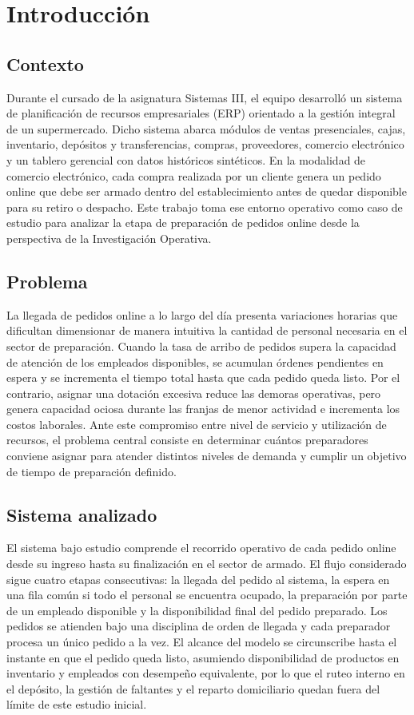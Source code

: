 \section{Introducción}

\subsection{Contexto}
Durante el cursado de la asignatura Sistemas III, el equipo desarrolló un sistema de planificación de recursos empresariales (ERP) orientado a la gestión integral de un supermercado.
Dicho sistema abarca módulos de ventas presenciales, cajas, inventario, depósitos y transferencias, compras, proveedores, comercio electrónico y un tablero gerencial con datos históricos sintéticos.
En la modalidad de comercio electrónico, cada compra realizada por un cliente genera un pedido online que debe ser armado dentro del establecimiento antes de quedar disponible para su retiro o despacho.
Este trabajo toma ese entorno operativo como caso de estudio para analizar la etapa de preparación de pedidos online desde la perspectiva de la Investigación Operativa.

\subsection{Problema}
La llegada de pedidos online a lo largo del día presenta variaciones horarias que dificultan dimensionar de manera intuitiva la cantidad de personal necesaria en el sector de preparación.
Cuando la tasa de arribo de pedidos supera la capacidad de atención de los empleados disponibles, se acumulan órdenes pendientes en espera y se incrementa el tiempo total hasta que cada pedido queda listo.
Por el contrario, asignar una dotación excesiva reduce las demoras operativas, pero genera capacidad ociosa durante las franjas de menor actividad e incrementa los costos laborales.
Ante este compromiso entre nivel de servicio y utilización de recursos, el problema central consiste en determinar cuántos preparadores conviene asignar para atender distintos niveles de demanda y cumplir un objetivo de tiempo de preparación definido.

\subsection{Sistema analizado}
El sistema bajo estudio comprende el recorrido operativo de cada pedido online desde su ingreso hasta su finalización en el sector de armado.
El flujo considerado sigue cuatro etapas consecutivas: la llegada del pedido al sistema, la espera en una fila común si todo el personal se encuentra ocupado, la preparación por parte de un empleado disponible y la disponibilidad final del pedido preparado.
Los pedidos se atienden bajo una disciplina de orden de llegada y cada preparador procesa un único pedido a la vez.
El alcance del modelo se circunscribe hasta el instante en que el pedido queda listo, asumiendo disponibilidad de productos en inventario y empleados con desempeño equivalente, por lo que el ruteo interno en el depósito, la gestión de faltantes y el reparto domiciliario quedan fuera del límite de este estudio inicial.

